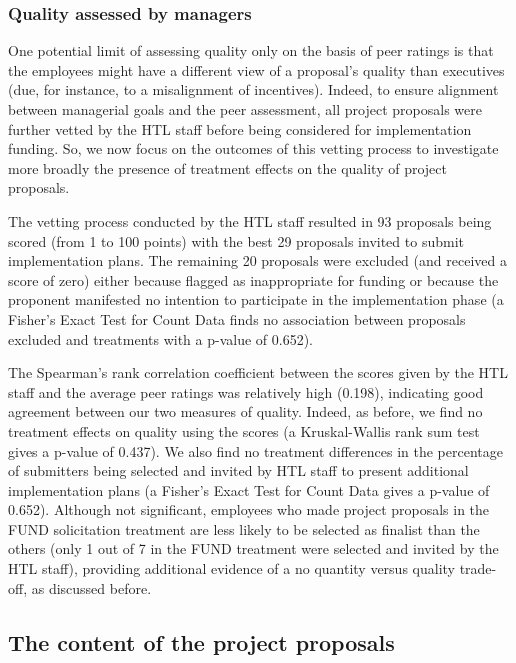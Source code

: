 \documentclass[12pt, titlepage]{article}
\begin{document}
\subsubsection{Quality assessed by
managers}\label{quality-assessed-by-managers}

One potential limit of assessing quality only on the basis of peer
ratings is that the employees might have a different view of a
proposal's quality than executives (due, for instance, to a misalignment
of incentives). Indeed, to ensure alignment between managerial goals and
the peer assessment, all project proposals were further vetted by the
HTL staff before being considered for implementation funding. So, we now
focus on the outcomes of this vetting process to investigate more
broadly the presence of treatment effects on the quality of project
proposals.

The vetting process conducted by the HTL staff resulted in 93 proposals
being scored (from 1 to 100 points) with the best 29 proposals invited
to submit implementation plans. The remaining 20 proposals were excluded
(and received a score of zero) either because flagged as inappropriate
for funding or because the proponent manifested no intention to
participate in the implementation phase (a Fisher's Exact Test for Count
Data finds no association between proposals excluded and treatments with
a p-value of 0.652).

The Spearman's rank correlation coefficient between the scores given by
the HTL staff and the average peer ratings was relatively high (0.198),
indicating good agreement between our two measures of quality. Indeed,
as before, we find no treatment effects on quality using the scores (a
Kruskal-Wallis rank sum test gives a p-value of 0.437). We also find no
treatment differences in the percentage of submitters being selected and
invited by HTL staff to present additional implementation plans (a
Fisher's Exact Test for Count Data gives a p-value of 0.652). Although
not significant, employees who made project proposals in the FUND
solicitation treatment are less likely to be selected as finalist than
the others (only 1 out of 7 in the FUND treatment were selected and
invited by the HTL staff), providing additional evidence of a no
quantity versus quality trade-off, as discussed before.

\subsection{The content of the project
proposals}\label{the-content-of-the-project-proposals}
\end{document}
